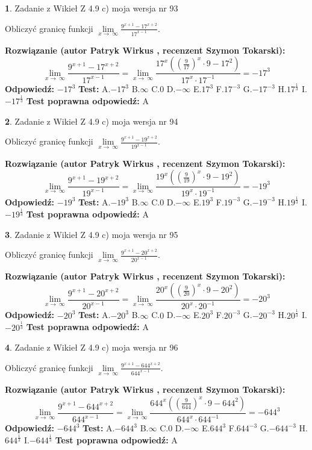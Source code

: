 \documentclass[12pt, a4paper]{article}
\theoremstyle{definition} %
\newtheorem{zad}{}
\newcommand{\zadStart}[1]{\begin{zad}#1\newline}
\newcommand{\zadStop}{\end{zad}}
\newcommand{\rozwStart}[2]{\noindent \textbf{Rozwiązanie (autor #1 , recenzent #2): }\newline}
\newcommand{\rozwStop}{\newline}
\newcommand{\odpStart}{\noindent \textbf{Odpowiedź:}\newline}
\newcommand{\odpStop}{\newline}
\newcommand{\testStart}{\noindent \textbf{Test:}\newline}
\newcommand{\testStop}{\newline}
\newcommand{\kluczStart}{\noindent \textbf{Test poprawna odpowiedź:}\newline}
\newcommand{\kluczStop}{\newline}
\begin{document}
\zadStart{Zadanie z Wikieł Z 4.9 c) moja wersja nr 93}


Obliczyć granicę funkcji  $\lim\limits_{x\to\ \infty}\frac{9^{x+1}-17^{x+2}}{17^{x-1}}$.
\zadStop
\rozwStart{Patryk Wirkus}{Szymon Tokarski}
$$\lim\limits_{x\to\ \infty}\frac{9^{x+1}-17^{x+2}}{17^{x-1}}=\lim\limits_{x\to\ \infty}\frac{17^{x}((\frac{9}{17})^{x}\cdot 9 -17^{2})}{17^{x}\cdot 17^{-1}} = -17^{3}$$
\rozwStop
\odpStart
$-17^{3}$
\odpStop
\testStart
A.$-17^{3}$ B.$\infty$ C.$0$ D.$-\infty$ E.$17^{3}$
F.$17^{-3}$ G.$-17^{-3}$
H.$17^{\frac{1}{3}}$
I.$-17^{\frac{1}{3}}$
\testStop
\kluczStart
A
\kluczStop



\zadStart{Zadanie z Wikieł Z 4.9 c) moja wersja nr 94}


Obliczyć granicę funkcji  $\lim\limits_{x\to\ \infty}\frac{9^{x+1}-19^{x+2}}{19^{x-1}}$.
\zadStop
\rozwStart{Patryk Wirkus}{Szymon Tokarski}
$$\lim\limits_{x\to\ \infty}\frac{9^{x+1}-19^{x+2}}{19^{x-1}}=\lim\limits_{x\to\ \infty}\frac{19^{x}((\frac{9}{19})^{x}\cdot 9 -19^{2})}{19^{x}\cdot 19^{-1}} = -19^{3}$$
\rozwStop
\odpStart
$-19^{3}$
\odpStop
\testStart
A.$-19^{3}$ B.$\infty$ C.$0$ D.$-\infty$ E.$19^{3}$
F.$19^{-3}$ G.$-19^{-3}$
H.$19^{\frac{1}{3}}$
I.$-19^{\frac{1}{3}}$
\testStop
\kluczStart
A
\kluczStop



\zadStart{Zadanie z Wikieł Z 4.9 c) moja wersja nr 95}


Obliczyć granicę funkcji  $\lim\limits_{x\to\ \infty}\frac{9^{x+1}-20^{x+2}}{20^{x-1}}$.
\zadStop
\rozwStart{Patryk Wirkus}{Szymon Tokarski}
$$\lim\limits_{x\to\ \infty}\frac{9^{x+1}-20^{x+2}}{20^{x-1}}=\lim\limits_{x\to\ \infty}\frac{20^{x}((\frac{9}{20})^{x}\cdot 9 -20^{2})}{20^{x}\cdot 20^{-1}} = -20^{3}$$
\rozwStop
\odpStart
$-20^{3}$
\odpStop
\testStart
A.$-20^{3}$ B.$\infty$ C.$0$ D.$-\infty$ E.$20^{3}$
F.$20^{-3}$ G.$-20^{-3}$
H.$20^{\frac{1}{3}}$
I.$-20^{\frac{1}{3}}$
\testStop
\kluczStart
A
\kluczStop



\zadStart{Zadanie z Wikieł Z 4.9 c) moja wersja nr 96}


Obliczyć granicę funkcji  $\lim\limits_{x\to\ \infty}\frac{9^{x+1}-644^{x+2}}{644^{x-1}}$.
\zadStop
\rozwStart{Patryk Wirkus}{Szymon Tokarski}
$$\lim\limits_{x\to\ \infty}\frac{9^{x+1}-644^{x+2}}{644^{x-1}}=\lim\limits_{x\to\ \infty}\frac{644^{x}((\frac{9}{644})^{x}\cdot 9 -644^{2})}{644^{x}\cdot 644^{-1}} = -644^{3}$$
\rozwStop
\odpStart
$-644^{3}$
\odpStop
\testStart
A.$-644^{3}$ B.$\infty$ C.$0$ D.$-\infty$ E.$644^{3}$
F.$644^{-3}$ G.$-644^{-3}$
H.$644^{\frac{1}{3}}$
I.$-644^{\frac{1}{3}}$
\testStop
\kluczStart
A
\kluczStop
\end{document}

